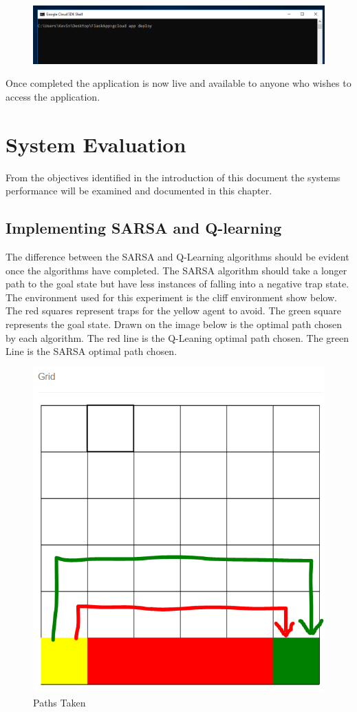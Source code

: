 \begin{figure}[H]
	\centering
	\includegraphics[width=1\linewidth]{img/DeployCmd}
	\caption{}
	\label{fig:deploycmd}
\end{figure}
Once completed the application is now live and available to anyone who wishes to access the application.



\chapter{System Evaluation}
From the objectives identified in the introduction of this document the systems performance will be examined and documented in this chapter.
\section{Implementing SARSA and Q-learning}
The difference between the SARSA and Q-Learning algorithms should be evident once the algorithms have completed. The SARSA algorithm should take a longer path to the goal state but have less instances of falling into a negative trap state.
The environment used for this experiment is the cliff environment show below. The red squares represent traps for the yellow agent to avoid. The green square represents the goal state. Drawn on the image below is the optimal path chosen by each algorithm. The red line is the Q-Leaning optimal path chosen. The green Line is the SARSA optimal path chosen.
\begin{figure}[H]
	\centering
	\includegraphics[width=0.7\linewidth]{img/pathOptimal}
	\caption{Paths Taken}
	\label{fig:pathoptimal}
\end{figure}

